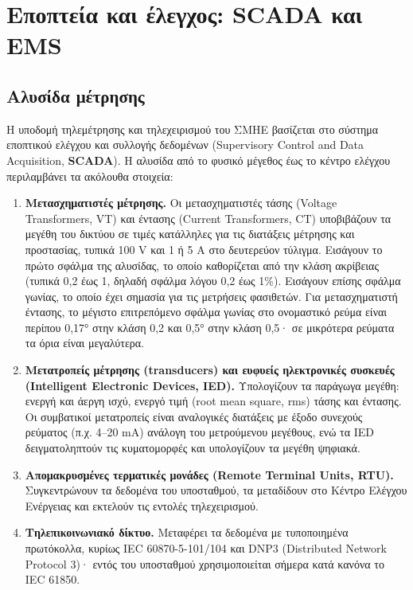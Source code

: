 \section{Εποπτεία και έλεγχος: SCADA και EMS}

\subsection{Αλυσίδα μέτρησης}
\label{sec:meas-chain}

Η υποδομή τηλεμέτρησης και τηλεχειρισμού του ΣΜΗΕ βασίζεται στο σύστημα εποπτικού ελέγχου
και συλλογής δεδομένων (Supervisory Control and Data Acquisition, \textbf{SCADA}). Η αλυσίδα
από το φυσικό μέγεθος έως το κέντρο ελέγχου περιλαμβάνει τα ακόλουθα στοιχεία:

\begin{enumerate}
\item \textbf{Μετασχηματιστές μέτρησης.} Οι μετασχηματιστές τάσης (Voltage Transformers, VT) και
      έντασης (Current Transformers, CT)
      υποβιβάζουν τα μεγέθη του δικτύου σε τιμές κατάλληλες για τις διατάξεις μέτρησης
      και προστασίας, τυπικά 100 V και 1 ή 5 A στο δευτερεύον τύλιγμα. Εισάγουν το πρώτο
      σφάλμα της αλυσίδας, το οποίο καθορίζεται από την κλάση ακρίβειας (τυπικά 0,2 έως 1,
      δηλαδή σφάλμα λόγου 0,2 έως 1\%). Εισάγουν επίσης σφάλμα γωνίας, το οποίο έχει σημασία για τις μετρήσεις φασιθετών.
      Για μετασχηματιστή έντασης, το μέγιστο επιτρεπόμενο σφάλμα γωνίας στο ονομαστικό ρεύμα
      είναι περίπου 0,17° στην κλάση 0,2 και 0,5° στην κλάση 0,5· σε μικρότερα ρεύματα τα
      όρια είναι μεγαλύτερα.
\item \textbf{Μετατροπείς μέτρησης (transducers) και ευφυείς ηλεκτρονικές συσκευές (Intelligent
      Electronic Devices, IED).}
      Υπολογίζουν τα παράγωγα μεγέθη: ενεργή και άεργη ισχύ, ενεργό τιμή (root mean
      square, rms) τάσης και έντασης. Οι συμβατικοί μετατροπείς είναι αναλογικές διατάξεις με
      έξοδο συνεχούς ρεύματος (π.χ. 4--20 mA) ανάλογη του μετρούμενου μεγέθους, ενώ τα IED
      δειγματοληπτούν τις κυματομορφές και υπολογίζουν τα μεγέθη ψηφιακά.
\item \textbf{Απομακρυσμένες τερματικές μονάδες (Remote Terminal Units, RTU).} Συγκεντρώνουν τα δεδομένα του
      υποσταθμού, τα μεταδίδουν στο Κέντρο Ελέγχου Ενέργειας και εκτελούν τις εντολές
      τηλεχειρισμού.
\item \textbf{Τηλεπικοινωνιακό δίκτυο.} Μεταφέρει τα δεδομένα με τυποποιημένα πρωτόκολλα,
      κυρίως IEC 60870-5-101/104 και DNP3 (Distributed Network Protocol 3)· εντός του υποσταθμού χρησιμοποιείται σήμερα
      κατά κανόνα το IEC 61850.
\end{enumerate}

